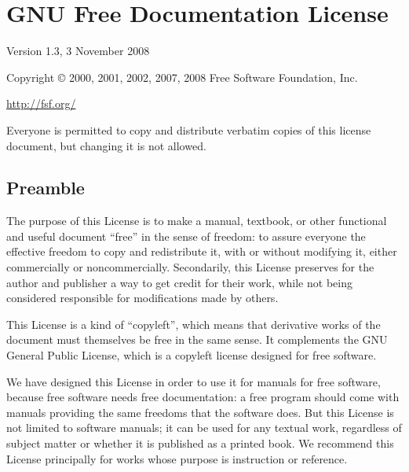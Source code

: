 \documentclass[a4paper,12pt]{book}
\theoremstyle{mes_exemples}	\newtheorem{exemple}[numtho]{Exemple}
\theoremstyle{mes_tho}
\begin{document}
\chapter{GNU Free Documentation License}

 \begin{center}

       Version 1.3, 3 November 2008


 Copyright \copyright{} 2000, 2001, 2002, 2007, 2008  Free Software Foundation, Inc.
 
 \bigskip

 \href{http://fsf.org/}{http://fsf.org/} 

 \bigskip
 
 Everyone is permitted to copy and distribute verbatim copies
 of this license document, but changing it is not allowed.
\end{center}

\section{Preamble}

The purpose of this License is to make a manual, textbook, or other
functional and useful document ``free'' in the sense of freedom: to
assure everyone the effective freedom to copy and redistribute it,
with or without modifying it, either commercially or noncommercially.
Secondarily, this License preserves for the author and publisher a way
to get credit for their work, while not being considered responsible
for modifications made by others.

This License is a kind of ``copyleft'', which means that derivative
works of the document must themselves be free in the same sense.  It
complements the GNU General Public License, which is a copyleft
license designed for free software.

We have designed this License in order to use it for manuals for free
software, because free software needs free documentation: a free
program should come with manuals providing the same freedoms that the
software does.  But this License is not limited to software manuals;
it can be used for any textual work, regardless of subject matter or
whether it is published as a printed book.  We recommend this License
principally for works whose purpose is instruction or reference.
\end{document}

